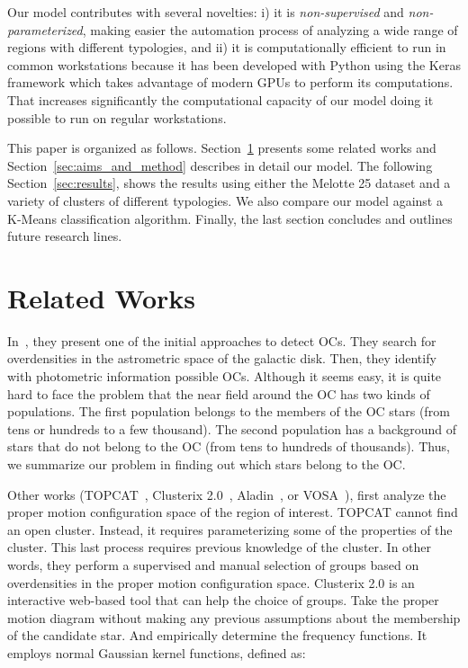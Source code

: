 \documentclass[preprint,12pt,authoryear]{elsarticle}
\begin{document}
Our model contributes with several novelties: i) it is \emph{non-supervised} and \emph{non-parameterized}, making easier the automation process of analyzing a wide range of regions with different typologies, and ii) it is computationally efficient to run in common workstations because it has been developed with Python using the Keras framework which takes advantage of modern GPUs to perform its computations. That increases significantly the computational capacity of our model doing it possible to run on regular workstations.

This paper is organized as follows. Section~\ref{sec:related_works} presents some related works and Section~\ref{sec:aims_and_method} describes in detail our model. The following Section~\ref{sec:results}, shows the results using either the Melotte 25 dataset and a variety of clusters of different typologies. We also compare our model against a K-Means classification algorithm. Finally, the last section concludes and outlines future research lines.

\section{Related Works}
\label{sec:related_works}

In~\cite{castro2020hunting}, they present one of the initial approaches to detect OCs. They search for overdensities in the astrometric space of the galactic disk. Then, they identify with photometric information possible OCs. Although it seems easy, it is quite hard to face the problem that the near field around the OC has two kinds of populations. The first population belongs to the members of the OC stars (from tens or hundreds to a few thousand). The second population has a background of stars that do not belong to the OC (from tens to hundreds of thousands). Thus, we summarize our problem in finding out which stars belong to the OC.

Other works (TOPCAT~\cite{taylor2005topcat}, Clusterix 2.0~\cite{balaguer2020clusterix}, Aladin~\cite{bonnarel2000aladin}, or VOSA~\cite{bayo2008vosa}), first analyze the proper motion configuration space of the region of interest. TOPCAT cannot find an open cluster. Instead, it requires parameterizing some of the properties of the cluster. This last process requires previous knowledge of the cluster. In other words, they perform a supervised and manual selection of groups based on overdensities in the proper motion configuration space. Clusterix 2.0 is an interactive web-based tool that can help the choice of groups. Take the proper motion diagram without making any previous assumptions about the membership of the candidate star. And empirically determine the frequency functions. It employs normal Gaussian kernel functions, defined as:
\end{document}
